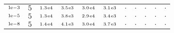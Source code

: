 \begin{tiny}
\begin{tabular}{@{$\;$}c@{$\;$}|@{$\;$}c@{$\;$}@{$\;$}c@{$\;$}@{$\;$}c@{$\;$}@{$\;$}c@{$\;$}@{$\;$}c@{$\;$}|@{$\;$}c@{$\;$}@{$\;$}c@{$\;$}@{$\;$}c@{$\;$}@{$\;$}c@{$\;$}@{$\;$}c@{$\;$}}
$\scriptstyle1\!\mathrm{\hspace{0.10em}e}-3$ & $\scriptstyle5$ & $\scriptstyle1.3\mathrm{\hspace{0.10em}e}4$ & $\scriptstyle3.5\mathrm{\hspace{0.10em}e}3$ & $\scriptstyle3.0\mathrm{\hspace{0.10em}e}4$ & $\scriptstyle3.1\mathrm{\hspace{0.10em}e}3$ & $\scriptstyle.$ & $\scriptstyle.$ & $\scriptstyle.$ & $\scriptstyle.$ & $\scriptstyle.$\\ 
$\scriptstyle1\!\mathrm{\hspace{0.10em}e}-5$ & $\scriptstyle5$ & $\scriptstyle1.3\mathrm{\hspace{0.10em}e}4$ & $\scriptstyle3.8\mathrm{\hspace{0.10em}e}3$ & $\scriptstyle2.9\mathrm{\hspace{0.10em}e}4$ & $\scriptstyle3.4\mathrm{\hspace{0.10em}e}3$ & $\scriptstyle.$ & $\scriptstyle.$ & $\scriptstyle.$ & $\scriptstyle.$ & $\scriptstyle.$\\ 
$\scriptstyle1\!\mathrm{\hspace{0.10em}e}-8$ & $\scriptstyle5$ & $\scriptstyle1.4\mathrm{\hspace{0.10em}e}4$ & $\scriptstyle4.1\mathrm{\hspace{0.10em}e}3$ & $\scriptstyle3.0\mathrm{\hspace{0.10em}e}4$ & $\scriptstyle3.7\mathrm{\hspace{0.10em}e}3$ & $\scriptstyle.$ & $\scriptstyle.$ & $\scriptstyle.$ & $\scriptstyle.$ & $\scriptstyle.$\\ 
\end{tabular} 
\end{tiny} 
